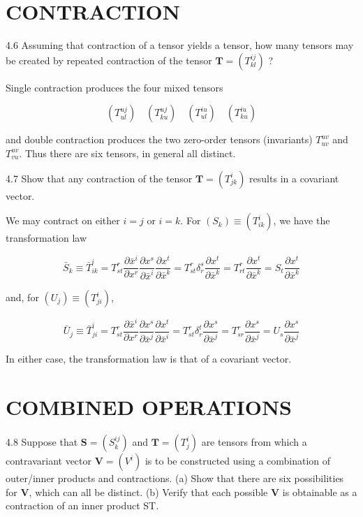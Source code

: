 \documentclass[10pt]{article}
\begin{document}
\section*{CONTRACTION}
4.6 Assuming that contraction of a tensor yields a tensor, how many tensors may be created by repeated contraction of the tensor $\mathbf{T}=\left(T_{k l}^{i j}\right)$ ?

Single contraction produces the four mixed tensors

$$
\left(T_{u l}^{u j}\right) \quad\left(T_{k u}^{u j}\right) \quad\left(T_{u l}^{i u}\right) \quad\left(T_{k u}^{i u}\right)
$$

and double contraction produces the two zero-order tensors (invariants) $T_{u v}^{u v}$ and $T_{v u}^{u v}$. Thus there are six tensors, in general all distinct.

4.7 Show that any contraction of the tensor $\mathbf{T}=\left(T_{j k}^{i}\right)$ results in a covariant vector.

We may contract on either $i=j$ or $i=k$. For $\left(S_{k}\right) \equiv\left(T_{i k}^{i}\right)$, we have the transformation law

$$
\bar{S}_{k} \equiv \bar{T}_{i k}^{i}=T_{s t}^{r} \frac{\partial \bar{x}^{i}}{\partial x^{r}} \frac{\partial x^{s}}{\partial \bar{x}^{i}} \frac{\partial x^{t}}{\partial \bar{x}^{k}}=T_{s t}^{r} \delta_{r}^{s} \frac{\partial x^{t}}{\partial \bar{x}^{k}}=T_{r t}^{r} \frac{\partial x^{t}}{\partial \bar{x}^{k}}=S_{t} \frac{\partial x^{t}}{\partial \bar{x}^{k}}
$$

and, for $\left(U_{j}\right) \equiv\left(T_{j i}^{i}\right)$,

$$
\bar{U}_{j} \equiv \bar{T}_{j i}^{i}=T_{s t}^{r} \frac{\partial \bar{x}^{i}}{\partial x^{r}} \frac{\partial x^{s}}{\partial \bar{x}^{j}} \frac{\partial x^{t}}{\partial \bar{x}^{i}}=T_{s t}^{r} \delta_{r}^{t} \frac{\partial x^{s}}{\partial \bar{x}^{j}}=T_{s r}^{r} \frac{\partial x^{s}}{\partial \bar{x}^{j}}=U_{s} \frac{\partial x^{s}}{\partial \bar{x}^{j}}
$$

In either case, the transformation law is that of a covariant vector.

\section*{COMBINED OPERATIONS}
4.8 Suppose that $\mathbf{S}=\left(S_{k}^{i j}\right)$ and $\mathbf{T}=\left(T_{j}^{i}\right)$ are tensors from which a contravariant vector $\mathbf{V}=\left(V^{i}\right)$ is to be constructed using a combination of outer/inner products and contractions. (a) Show that there are six possibilities for $\mathbf{V}$, which can all be distinct. (b) Verify that each possible $\mathbf{V}$ is obtainable as a contraction of an inner product ST.
\end{document}
